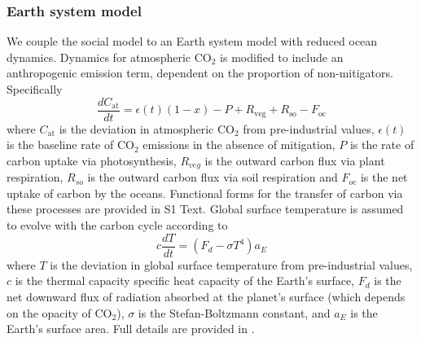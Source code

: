\documentclass[10pt,letterpaper]{article}
\begin{document}
\subsubsection*{Earth system model} We couple the social model to an Earth system model\cite{lenton00} with reduced ocean dynamics\cite{muryshev15}. Dynamics for atmospheric $\text{CO}_2$ is modified to include an anthropogenic emission term, dependent on the proportion of non-mitigators. Specifically
\begin{equation}
\frac{dC_{\text{at}}}{dt} = \epsilon(t)(1-x) -P + R_{\text{veg}} + R_{\text{so}} - F_{\text{oc}} \label{eq:model_cat}
\end{equation}
where $C_{\text{at}}$ is the deviation in atmospheric $\text{CO}_2$ from pre-industrial values, $\epsilon(t)$ is the baseline rate of $\text{CO}_2$ emissions in the absence of mitigation, $P$ is the rate of carbon uptake via photosynthesis, $R_{veg}$ is the outward carbon flux via plant respiration, $R_{so}$ is the outward carbon flux via soil respiration and $F_{oc}$ is the net uptake of carbon by the oceans. Functional forms for the transfer of carbon via these processes are provided in S1 Text. Global surface temperature is assumed to evolve with the carbon cycle according to \cite{lenton00}
\begin{equation}
c\frac{dT}{dt}  = (F_d - \sigma T^4)a_E \label{eq:model_t}
\end{equation}
where $T$ is the deviation in global surface temperature from pre-industrial values, $c$ is the thermal capacity specific heat capacity of the Earth's surface, $F_d$ is the net downward flux of radiation absorbed at the planet's surface (which depends on the opacity of $\text{CO}_2$), $\sigma$ is the Stefan-Boltzmann constant, and $a_E$ is the Earth's surface area. Full details are provided in .

\end{document}

